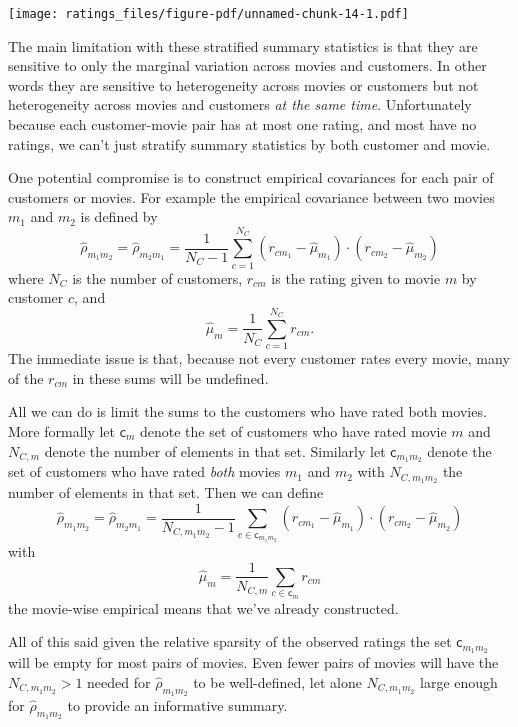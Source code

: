 \documentclass[
  letterpaper,
  DIV=11,
  numbers=noendperiod]{scrartcl}
\begin{document}
\texttt{[image: ratings\_files/figure-pdf/unnamed-chunk-14-1.pdf]}

The main limitation with these stratified summary statistics is that
they are sensitive to only the marginal variation across movies and
customers. In other words they are sensitive to heterogeneity across
movies or customers but not heterogeneity across movies and customers
\emph{at the same time}. Unfortunately because each customer-movie pair
has at most one rating, and most have no ratings, we can't just stratify
summary statistics by both customer and movie.

One potential compromise is to construct empirical covariances for each
pair of customers or movies. For example the empirical covariance
between two movies \(m_{1}\) and \(m_{2}\) is defined by \[
\hat{\rho}_{m_{1} m_{2}}
=
\hat{\rho}_{m_{2} m_{1}}
=
\frac{1}{N_{C} - 1} \sum_{c = 1}^{N_{C}}
(r_{c m_{1}} - \hat{\mu}_{m_{1}}) \cdot
(r_{c m_{2}} - \hat{\mu}_{m_{2}})
\] where \(N_{C}\) is the number of customers, \(r_{c m}\) is the rating
given to movie \(m\) by customer \(c\), and \[
\hat{\mu}_{m}
=
\frac{1}{N_{C}} \sum_{c = 1}^{N_{C}} r_{c m}.
\] The immediate issue is that, because not every customer rates every
movie, many of the \(r_{c m}\) in these sums will be undefined.

All we can do is limit the sums to the customers who have rated both
movies. More formally let \(\mathsf{c}_{m}\) denote the set of customers
who have rated movie \(m\) and \(N_{C, m}\) denote the number of
elements in that set. Similarly let \(\mathsf{c}_{m_{1} m_{2}}\) denote
the set of customers who have rated \emph{both} movies \(m_{1}\) and
\(m_{2}\) with \(N_{C, m_{1} m_{2}}\) the number of elements in that
set. Then we can define \[
\hat{\rho}_{m_{1} m_{2}}
=
\hat{\rho}_{m_{2} m_{1}}
=
\frac{1}{N_{C, m_{1} m_{2}} - 1} \sum_{c \in \mathsf{c}_{m_{1} m_{2}}}
(r_{c m_{1}} - \hat{\mu}_{m_{1}}) \cdot
(r_{c m_{2}} - \hat{\mu}_{m_{2}})
\] with \[
\hat{\mu}_{m}
=
\frac{1}{N_{C, m}} \sum_{c \in \mathsf{c}_{m}} r_{c m}
\] the movie-wise empirical means that we've already constructed.

All of this said given the relative sparsity of the observed ratings the
set \(\mathsf{c}_{m_{1} m_{2}}\) will be empty for most pairs of movies.
Even fewer pairs of movies will have the \(N_{C, m_{1} m_{2}} > 1\)
needed for \(\hat{\rho}_{m_{1} m_{2}}\) to be well-defined, let alone
\(N_{C, m_{1} m_{2}}\) large enough for \(\hat{\rho}_{m_{1} m_{2}}\) to
provide an informative summary.
\end{document}
